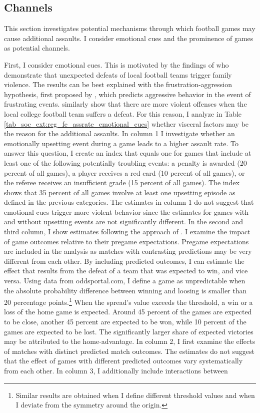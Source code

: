 \subsection{Channels}
This section investigates potential mechanisms through which football games may cause additional assaults. I consider emotional cues and the prominence of games as potential channels.



First, I consider emotional cues. This is motivated by the findings of \cite{card2011family} who demonstrate that unexpected defeats of local football teams trigger family violence. The results can be best explained with the frustration-aggression hypothesis, first proposed by \cite{dollard1939frustration}, which predicts aggressive behavior in the event of frustrating events. \cite{rees2009college} similarly show that there are more violent offenses when the local college football team suffers a defeat. For this reason, I analyze in Table \ref{tab_soc_ext:reg_fe_assrate_emotional_cues} whether visceral factors may be the reason for the additional assaults. In column 1 I investigate whether an emotionally upsetting event during a game leads to a higher assault rate. To answer this question, I create an index that equals one for games that include at least one of the following potentially troubling events: a penalty is awarded (20 percent of all games), a player receives a red card (10 percent of all games), or the referee receives an insufficient grade (15 percent of all games). The index shows that 35 percent of all games involve at least one upsetting episode as defined in the previous categories. The estimates in column 1 do not suggest that emotional cues trigger more violent behavior since the estimates for games with and without upsetting events are not significantly different. In the second and third column, I show estimates following the approach of \cite{card2011family}. I examine the impact of game outcomes relative to their pregame expectations. Pregame expectations are included in the analysis as matches with contrasting predictions may be very different from each other. By including predicted outcomes, I can estimate the effect that results from the defeat of a team that was expected to win, and vice versa. Using data from oddsportal.com, I define a game as unpredictable when the absolute probability difference between winning and loosing is smaller than 20 percentage points.\footnote{Similar results are obtained when I define different threshold values and when I deviate from the symmetry around the origin.} When the spread's value exceeds the threshold, a win or a loss of the home game is expected. Around 45 percent of the games are expected to be close, another 45 percent are expected to be won, while 10 percent of the games are expected to be lost. The significantly larger share of expected victories may be attributed to the home-advantage. In column 2, I first examine the effects of matches with distinct predicted match outcomes. The estimates do not suggest that the effect of games with different predicted outcomes vary systematically from each other. In column 3, I additionally include interactions between 